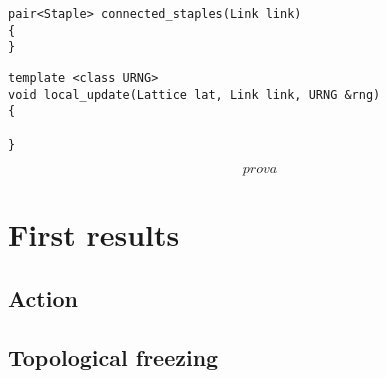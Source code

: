\begin{lstlisting}[caption={Connected staples function}]
pair<Staple> connected_staples(Link link)
{
}
\end{lstlisting}

\begin{lstlisting}[caption={Local update function}]
template <class URNG>
void local_update(Lattice lat, Link link, URNG &rng)
{

}
\end{lstlisting}


\begin{equation}
    prova
\end{equation}

\section{First results}

\subsection{Action}

\subsection{Topological freezing}

